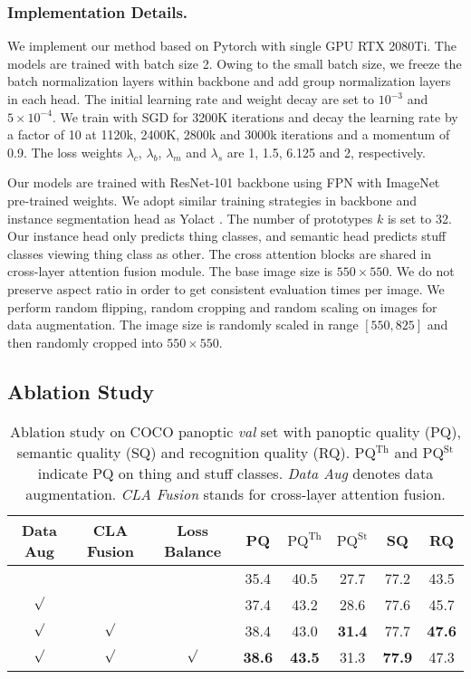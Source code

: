 \documentclass[runningheads]{llncs}
\begin{document}
\subsubsection{Implementation Details.}
We implement our method based on Pytorch \cite{Paszke2019} with single GPU RTX 2080Ti. The models are trained with batch size 2. Owing to the small batch size, we freeze the batch normalization layers within backbone and add group normalization \cite{Wu2018} layers in each head. The initial learning rate and weight decay are set to $10^{-3}$ and $5\times10^{-4}$. We train with SGD for 3200K iterations and decay the learning rate by a factor of 10 at 1120k, 2400K, 2800k and 3000k iterations and a momentum of 0.9. The loss weights $\lambda_c$, $\lambda_b$, $\lambda_m$ and $\lambda_s$ are 1, 1.5, 6.125 and 2, respectively.

Our models are trained with ResNet-101 \cite{He2016} backbone using FPN with ImageNet \cite{Russakovsky2015} pre-trained weights. We adopt similar training strategies in backbone and instance segmentation head as Yolact \cite{Bolya}. The number of prototypes $k$ is set to 32. Our instance head only predicts thing classes, and semantic head predicts stuff classes viewing thing class as other. The cross attention blocks are shared in cross-layer attention fusion module. The base image size is $550\times550$. We do not preserve aspect ratio in order to get consistent evaluation times per image. We perform random flipping, random cropping and random scaling on images for data augmentation. The image size is randomly scaled in range $[550, 825]$ and then randomly cropped into $550 \times550$. 


\subsection{Ablation Study}

\begin{table}[!tb]
\centering
\caption{Ablation study on COCO panoptic \emph{val} set with panoptic quality (PQ), semantic quality (SQ) and recognition quality  (RQ). PQ$^{\text{Th}}$ and PQ$^{\text{St}}$ indicate PQ on thing and stuff classes. \emph{Data Aug} denotes data augmentation. \emph{CLA Fusion} stands for cross-layer attention fusion. }
\begin{tabular}{c c c | c c c c c}
\hline
Data Aug & CLA Fusion & Loss Balance &PQ                   & $\text{PQ}^{\text{Th}}$ & $\text{PQ}^{\text{St}}$ &  SQ &  RQ  \\ \hline \hline
                &               &               & 35.4 & 40.5 & 27.7 & 77.2 & 43.5  \\ \hline
     $\surd $   &               &               & 37.4 & 43.2 & 28.6 & 77.6 & 45.7  \\ \hline
      $\surd $  &   $\surd $    &               & 38.4 & 43.0 & \textbf{31.4} & 77.7 & \textbf{47.6}  \\ \hline
    $\surd $    &   $\surd $    &   $\surd $    & \textbf{38.6} & \textbf{43.5} & 31.3 & \textbf{77.9} & 47.3  \\ \hline

\end{tabular}
\label{table:ablation}
\end{table}
\end{document}
